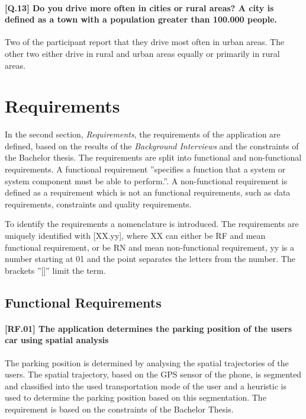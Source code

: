 \paragraph{[Q.13] Do you drive more often in cities or rural areas? A city is defined as a town with a population greater than 100.000 people.}
Two of the participant report that they drive most often in urban areas. The other two either drive in rural and urban areas equally or primarily in rural areas.


\section{Requirements}
In the second section, \textit{Requirements}, the requirements of the application are defined, based on the results of the \textit{Background Interviews} and the constraints of the Bachelor thesis. The requirements are split into functional and non-functional requirements. A functional requirement ''specifies a function that a system or system component must be able to perform.''. A non-functional requirement is defined as a requirement which is not an functional requirements, such as data requirements, constraints and quality requirements. \cite{eide2005quantification}

To identify the requirements a nomenclature is introduced. The requirements are uniquely identified with [XX.yy], where XX can either be RF and mean functional requirement, or be RN and mean non-functional requirement, yy is a number starting at 01 and the point separates the letters from the number. The brackets ''[]'' limit the term.  

\subsection{Functional Requirements}

\paragraph{[RF.01] The application determines the parking position of the users car using spatial analysis}
The parking position is determined by analysing the spatial trajectories of the users. The spatial trajectory, based on the GPS sensor of the phone, is segmented and classified into the used transportation mode of the user and a heuristic is used to determine the parking position based on this segmentation. The requirement is based on the constraints of the Bachelor Thesis. 

